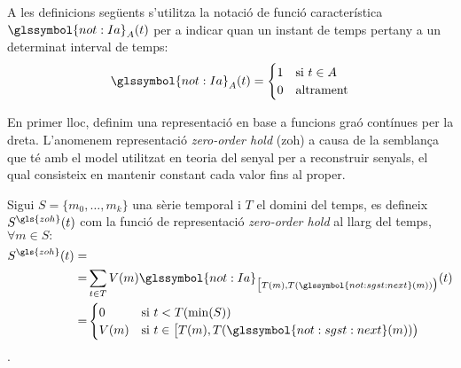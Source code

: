 A les definicions següents s'utilitza la notació de funció
característica $\glssymbol{not:Ia}_A(t)$ per a indicar quan un instant
de temps pertany a un determinat interval de temps:
\[
\glssymbol{not:Ia}_A(t) = 
   \begin{cases}
      1 & \text{si } t\in A \\
      0 & \text{altrament}
    \end{cases}
\]



En primer lloc, definim una representació en base a funcions graó
contínues per la dreta. L'anomenem representació \emph{zero-order
  hold} (\gls{zoh}) a causa de la semblança que té amb el model utilitzat en
teoria del senyal per a reconstruir senyals, el qual consisteix en mantenir
constant cada valor fins al proper.
\begin{definition}
  \label{def:sgst:zoh}
  Sigui $S=\{m_0,\ldots,m_k\}$ una sèrie temporal i $T$ el domini del
  temps, es defineix $S^{\gls{zoh}}(t)$ com la funció de representació
  \emph{zero-order hold} al llarg del temps, $\forall m \in S:$
  \begin{align*}
    S^{\gls{zoh}}(t) = &  \\
    = & \sum_{t\in T} V(m) \glssymbol{not:Ia}_{\big[T(m), T(\glssymbol{not:sgst:next}(m)) \big)}(t)\\
    = & \begin{cases}
      0 & \text{si }  t<T(\min(S)) \\
      V(m) & \text{si } t\in
      \big[T(m),T(\glssymbol{not:sgst:next}(m))\big)
    \end{cases}
         \end{align*}.
\end{definition}



